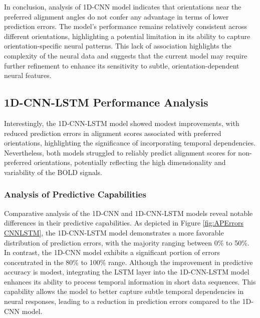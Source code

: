 \documentclass[a4paper]{article}
\begin{document}
In conclusion, analysis of 1D-CNN model indicates that orientations near the preferred alignment angles do not confer any advantage in terms of lower prediction errors. The model's performance remains relatively consistent across different orientations, highlighting a potential limitation in its ability to capture orientation-specific neural patterns. This lack of association highlights the complexity of the neural data and suggests that the current model may require further refinement to enhance its sensitivity to subtle, orientation-dependent neural features. 


\subsection{\textbf{1D-CNN-LSTM Performance Analysis}}
Interestingly, the 1D-CNN-LSTM model showed modest improvements, with reduced prediction errors in alignment scores associated with preferred orientations, highlighting the significance of incorporating temporal dependencies. Nevertheless, both models struggled to reliably predict alignment scores for non-preferred orientations, potentially reflecting the high dimensionality and variability of the BOLD signals.\\

\subsubsection{Analysis of Predictive Capabilities}

Comparative analysis of the 1D-CNN and 1D-CNN-LSTM models reveal notable differences in their predictive capabilities. As depicted in Figure \ref{fig:APErrors CNNLSTM}, the 1D-CNN-LSTM model demonstrates a more favorable distribution of prediction errors, with the majority ranging between 0\% to 50\%. In contrast, the 1D-CNN model exhibits a significant portion of errors concentrated in the 80\% to 100\% range. Although the improvement in predictive accuracy is modest, integrating the LSTM layer into the 1D-CNN-LSTM model enhances its ability to process temporal information in short data sequences. This capability allows the model to better capture subtle temporal dependencies in neural responses, leading to a reduction in prediction errors compared to the 1D-CNN model.\\
\end{document}
